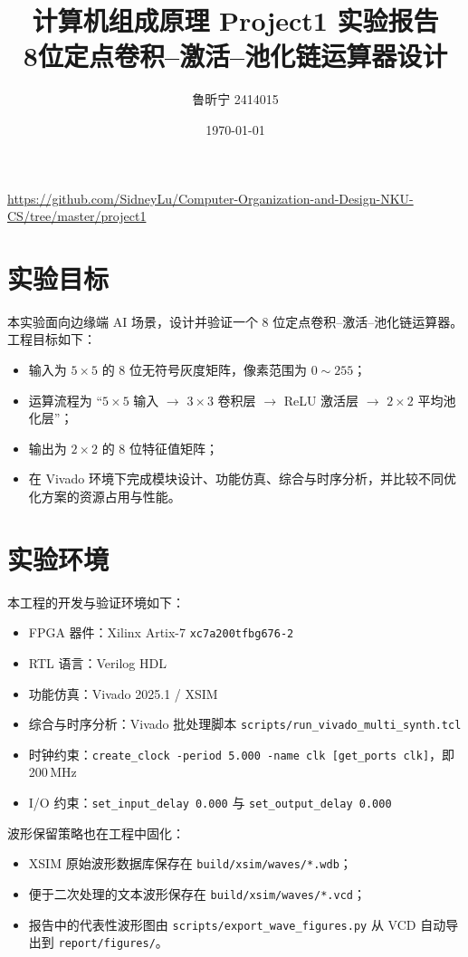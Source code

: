 \documentclass{article}
\title{计算机组成原理 Project1 实验报告\\8位定点卷积--激活--池化链运算器设计}
\author{鲁昕宁 2414015}
\date{\today}
\begin{document}
\maketitle
\begin{center}
  \url{https://github.com/SidneyLu/Computer-Organization-and-Design-NKU-CS/tree/master/project1}
\end{center}

\newpage

\section{实验目标}
本实验面向边缘端 AI 场景，设计并验证一个 8 位定点卷积--激活--池化链运算器。工程目标如下：
\begin{itemize}
  \item 输入为 $5\times 5$ 的 8 位无符号灰度矩阵，像素范围为 $0\sim255$；
  \item 运算流程为 ``$5\times 5$ 输入 $\rightarrow$ $3\times 3$ 卷积层 $\rightarrow$ ReLU 激活层 $\rightarrow$ $2\times 2$ 平均池化层''；
  \item 输出为 $2\times 2$ 的 8 位特征值矩阵；
  \item 在 Vivado 环境下完成模块设计、功能仿真、综合与时序分析，并比较不同优化方案的资源占用与性能。
\end{itemize}

\section{实验环境}
本工程的开发与验证环境如下：
\begin{itemize}
  \item FPGA 器件：Xilinx Artix-7 \texttt{xc7a200tfbg676-2}
  \item RTL 语言：Verilog HDL
  \item 功能仿真：Vivado 2025.1 / XSIM
  \item 综合与时序分析：Vivado 批处理脚本 \texttt{scripts/run\_vivado\_multi\_synth.tcl}
  \item 时钟约束：\texttt{create\_clock -period 5.000 -name clk [get\_ports clk]}，即 200\,MHz
  \item I/O 约束：\texttt{set\_input\_delay 0.000} 与 \texttt{set\_output\_delay 0.000}
\end{itemize}

波形保留策略也在工程中固化：
\begin{itemize}
  \item XSIM 原始波形数据库保存在 \verb|build/xsim/waves/*.wdb|；
  \item 便于二次处理的文本波形保存在 \verb|build/xsim/waves/*.vcd|；
  \item 报告中的代表性波形图由 \verb|scripts/export_wave_figures.py| 从 VCD 自动导出到 \verb|report/figures/|。
\end{itemize}
\end{document}
